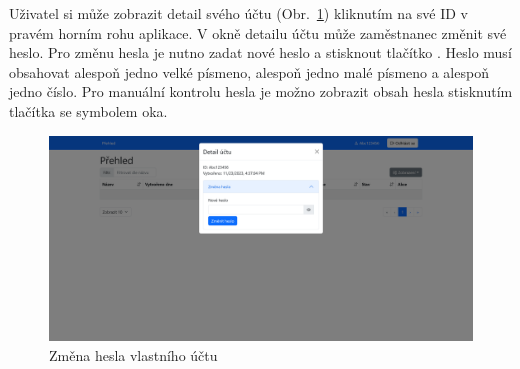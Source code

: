 Uživatel si může zobrazit detail svého účtu (Obr.~\ref{fig:zmena-hesla-uzivatel}) kliknutím na své ID v pravém horním rohu aplikace.
V okně detailu účtu může zaměstnanec změnit své heslo.
Pro změnu hesla je nutno zadat nové heslo a stisknout tlačítko .
Heslo musí obsahovat alespoň jedno velké písmeno, alespoň jedno malé písmeno a alespoň jedno číslo.
Pro manuální kontrolu hesla je možno zobrazit obsah hesla stisknutím tlačítka se symbolem oka.

\begin{figure}[H]
    \centering
    \includegraphics[width=\textwidth]{../img/screenshots/zmena-hesla-uzivatel}
    \caption{Změna hesla vlastního účtu}\label{fig:zmena-hesla-uzivatel}
\end{figure}
